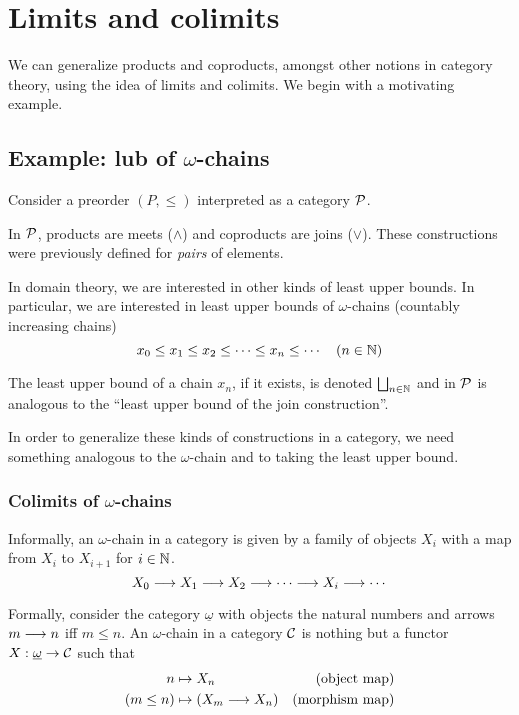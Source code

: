 
\newcommand*{\threesim}{%
\mathrel{\vcenter{\offinterlineskip
\hbox{$\sim$}\vskip-.45ex\hbox{$\sim$}\vskip-.45ex\hbox{$\sim$}}}}


\chapter{Limits and colimits}

We can generalize products and coproducts, amongst other notions in category
theory, using the idea of limits and colimits. We begin with a motivating
example.

\section{Example: lub of $\omega$-chains}

Consider a preorder $(P, \leq)$ interpreted as a category  $\mathcal{P}$.

In $\mathcal{P}$,  products are meets ($\wedge$) and coproducts are joins
($\vee$). These constructions were previously defined for \emph{pairs} of
elements.

In domain theory, we are interested in other kinds of least upper bounds. In
particular, we are interested in least upper bounds of $\omega$-chains
(countably increasing chains)
\[
	x_0 \leq x_1 \leq x_2 \leq \cdots \leq x_n \leq \cdots \quad (n \in \mathbb{N})
\]

The least upper bound of a chain $x_n$, if it exists, is denoted $\bigsqcup_{n \in
    \mathbb{N}}$ and in $\mathcal{P}$ is analogous to the ``least upper bound of the
join construction''.

In order to generalize these kinds of constructions in a category, we need
something analogous to the $\omega$-chain and to taking the least upper bound.

\subsection{Colimits of $\omega$-chains}

\begin{definition}
Informally, an $\omega$-chain in a category is given by a family of objects
$X_i$ with a map from $X_i$ to $X_{i+1}$ for $i \in \mathbb{N}$.
\[
    X_0 \longrightarrow X_1 \longrightarrow X_2 \longrightarrow \cdots \longrightarrow X_i
    \longrightarrow \cdots
\]

Formally, consider the category $\underline{\omega}$ with objects the natural
numbers and arrows $m \longrightarrow n$ iff $m \leq n$. An $\omega$-chain in a
category $\mathcal{C}$ is nothing but a functor $X : \underline{\omega} \to
\mathcal{C}$ such that
\begin{align*}
	n & \mapsto X_n & (\text{object map}) \\
	(m \leq n) & \mapsto (X_m \longrightarrow X_n) &(\text{morphism map})
\end{align*}

\end{definition}

